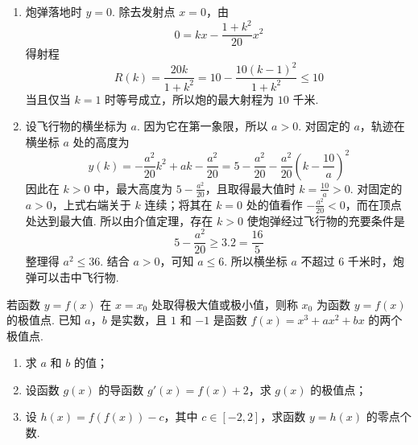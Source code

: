 \begin{solution}
\begin{enumerate}
\item 炮弹落地时 \(y=0\). 除去发射点 \(x=0\)，由
\[
0=kx-\frac{1+k^2}{20}x^2
\]
得射程
\[
R(k)=\frac{20k}{1+k^2}=10-\frac{10(k-1)^2}{1+k^2}\leqslant10
\]
当且仅当 \(k=1\) 时等号成立，所以炮的最大射程为 \(10\) 千米.

\item 设飞行物的横坐标为 \(a\). 因为它在第一象限，所以 \(a>0\). 对固定的 \(a\)，轨迹在横坐标 \(a\) 处的高度为
\[
y(k)=-\frac{a^2}{20}k^2+ak-\frac{a^2}{20}=5-\frac{a^2}{20}-\frac{a^2}{20}\left(k-\frac{10}{a}\right)^2
\]
因此在 \(k>0\) 中，最大高度为 \(5-\frac{a^2}{20}\)，且取得最大值时 \(k=\frac{10}{a}>0\). 对固定的 \(a>0\)，上式右端关于 \(k\) 连续；将其在 \(k=0\) 处的值看作 \(-\frac{a^2}{20}<0\)，而在顶点处达到最大值. 所以由介值定理，存在 \(k>0\) 使炮弹经过飞行物的充要条件是
\[
5-\frac{a^2}{20}\geqslant3.2=\frac{16}{5}
\]
整理得 \(a^2\leqslant36\). 结合 \(a>0\)，可知 \(a\leqslant6\). 所以横坐标 \(a\) 不超过 \(6\) 千米时，炮弹可以击中飞行物.
\end{enumerate}
\end{solution}

\begin{problem}
若函数 \(y=f(x)\) 在 \(x=x_{0}\) 处取得极大值或极小值，则称 \(x_{0}\) 为函数 \(y=f(x)\) 的极值点. 已知 \(a\)，\(b\) 是实数，且 \(1\) 和 \(-1\) 是函数 \(f(x)=x^3+ax^2+bx\) 的两个极值点.

\begin{enumerate}
\item 求 \(a\) 和 \(b\) 的值；
\item 设函数 \(g(x)\) 的导函数 \(g'(x)=f(x)+2\)，求 \(g(x)\) 的极值点；
\item 设 \(h(x)=f(f(x))-c\)，其中 \(c\in[-2,2]\)，求函数 \(y=h(x)\) 的零点个数.
\end{enumerate}
\end{problem}


